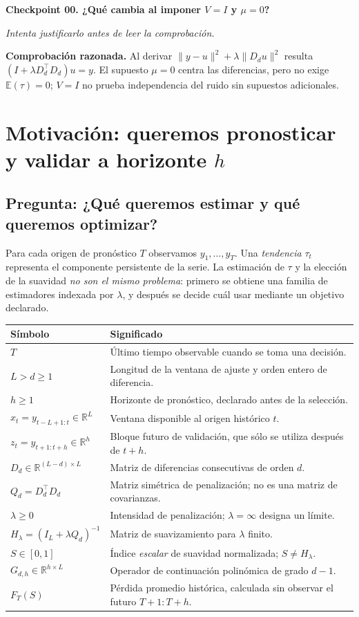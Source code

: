 \documentclass[11pt,letterpaper,parskip=half,headings=small]{scrartcl}
\theoremstyle{definition}\newtheorem{definicion}[proposicion]{Definición}
\theoremstyle{remark}\newtheorem{observacion}[proposicion]{Observación}
\newcommand{\R}{\mathbb R}\newcommand{\EE}{\mathbb E}\newcommand{\Var}{\operatorname{Var}}
\newcommand{\pregunta}[1]{\subsection{Pregunta: #1}}
\newcommand{\checkpoint}[3]{%
  \par\medskip\noindent\textbf{\color{blue!45!black}Checkpoint #1. #2}\par
  \noindent\emph{Intenta justificarlo antes de leer la comprobación.}\par
  \noindent\textbf{Comprobación razonada. }#3\par\bigskip
}
\begin{document}
\checkpoint{00}{¿Qué cambia al imponer $V=I$ y $\mu=0$?}{Al derivar $\|y-u\|^2+\lambda\|D_du\|^2$ resulta $(I+\lambda D_d^\top D_d)u=y$. El supuesto $\mu=0$ centra las diferencias, pero no exige $\EE(\tau)=0$; $V=I$ no prueba independencia del ruido sin supuestos adicionales.}

\section{Motivación: queremos pronosticar y validar a horizonte $h$}
\pregunta{¿Qué queremos estimar y qué queremos optimizar?}
Para cada origen de pronóstico $T$ observamos $y_1,\ldots,y_T$. Una \emph{tendencia} $\tau_t$ representa el componente persistente de la serie. La estimación de $\tau$ y la elección de la suavidad \emph{no son el mismo problema}: primero se obtiene una familia de estimadores indexada por $\lambda$, y después se decide cuál usar mediante un objetivo declarado.

\begin{center}\small
\begin{tabularx}{\textwidth}{@{}lX@{}}\toprule
Símbolo & Significado \\ \midrule
$T$ & Último tiempo observable cuando se toma una decisión.\\
$L>d\geq1$ & Longitud de la ventana de ajuste y orden entero de diferencia.\\
$h\geq1$ & Horizonte de pronóstico, declarado antes de la selección.\\
$x_t=y_{t-L+1:t}\in\R^L$ & Ventana disponible al origen histórico $t$.\\
$z_t=y_{t+1:t+h}\in\R^h$ & Bloque futuro de validación, que sólo se utiliza después de $t+h$.\\
$D_d\in\R^{(L-d)\times L}$ & Matriz de diferencias consecutivas de orden $d$.\\
$Q_d=D_d^\top D_d$ & Matriz simétrica de penalización; no es una matriz de covarianzas.\\
$\lambda\geq0$ & Intensidad de penalización; $\lambda=\infty$ designa un límite.\\
$H_\lambda=(I_L+\lambda Q_d)^{-1}$ & Matriz de suavizamiento para $\lambda$ finito.\\
$S\in[0,1]$ & Índice \emph{escalar} de suavidad normalizada; $S\neq H_\lambda$.\\
$G_{d,h}\in\R^{h\times L}$ & Operador de continuación polinómica de grado $d-1$.\\
$F_T(S)$ & Pérdida promedio histórica, calculada sin observar el futuro $T+1:T+h$.\\
\bottomrule\end{tabularx}
\end{center}
\end{document}
